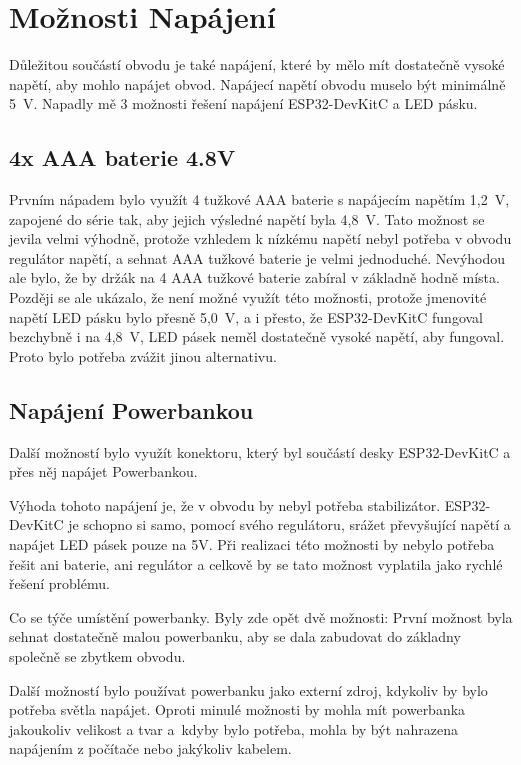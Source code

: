 \section{Možnosti Napájení}

Důležitou součástí obvodu je také napájení, které by mělo mít dostatečně vysoké napětí, aby mohlo napájet obvod. Napájecí napětí obvodu muselo být minimálně 5~V. Napadly mě 3 možnosti řešení napájení ESP32-DevKitC a LED pásku.


\subsection{4x AAA baterie 4.8V}

Prvním nápadem bylo využít 4 tužkové AAA baterie s napájecím napětím 1,2~V, zapojené do série tak, aby jejich výsledné napětí byla 4,8~V. Tato možnost se jevila velmi výhodně, protože vzhledem k nízkému napětí nebyl potřeba v obvodu regulátor napětí, a sehnat AAA tužkové baterie je velmi jednoduché. Nevýhodou ale bylo, že by držák na 4 AAA tužkové baterie zabíral v základně hodně místa.
\newpage
Později se ale ukázalo, že není možné využít této možnosti, protože jmenovité napětí LED pásku bylo přesně 5,0~V, a i přesto, že ESP32-DevKitC fungoval bezchybně i na 4,8~V, LED pásek neměl dostatečně vysoké napětí, aby fungoval. Proto bylo potřeba zvážit jinou alternativu.


\subsection{Napájení Powerbankou}

Další možností bylo využít konektoru, který byl součástí desky  ESP32-DevKitC a přes něj napájet Powerbankou.

Výhoda tohoto napájení je, že v obvodu by nebyl potřeba stabilizátor. ESP32-DevKitC je schopno si samo, pomocí svého regulátoru, srážet převyšující napětí a napájet LED pásek pouze na 5V. Při realizaci této možnosti by nebylo potřeba řešit ani baterie, ani regulátor a celkově by se tato možnost vyplatila jako rychlé řešení problému. 

Co se týče umístění powerbanky. Byly zde opět dvě možnosti: %
První možnost byla sehnat dostatečně malou powerbanku, aby se dala zabudovat do základny společně se zbytkem obvodu. 

Další možností bylo používat powerbanku jako externí zdroj, kdykoliv by bylo potřeba světla napájet. Oproti minulé možnosti by mohla mít powerbanka jakoukoliv velikost a tvar a~kdyby bylo potřeba, mohla by být nahrazena napájením z počítače nebo jakýkoliv kabelem.  

